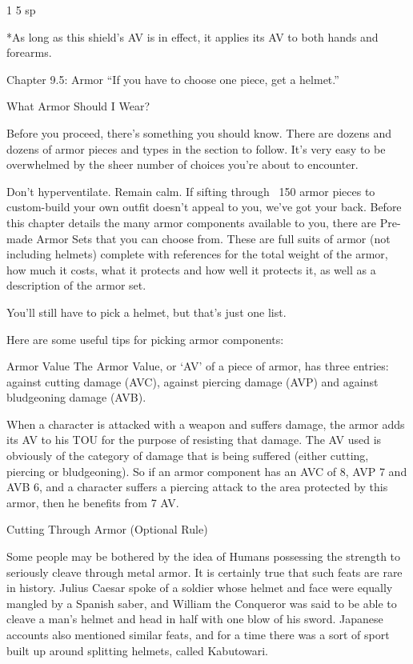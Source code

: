 \documentclass[oneside,11pt,english]{book}
\begin{document}
1 5 sp 

*As long as this shield’s AV is in effect, it applies its AV to both hands and forearms. 

 

Chapter 9.5: Armor 
“If you have to choose one piece, get a helmet.” 

 

What Armor Should I Wear? 

 

Before you proceed, there’s something you should know. There are dozens and dozens of armor pieces 
and types in the section to follow. It’s very easy to be overwhelmed by the sheer number of choices 
you’re about to encounter. 

 

Don’t hyperventilate. Remain calm. If sifting through ~150 armor pieces to custom-build your own outfit 
doesn’t appeal to you, we’ve got your back. Before this chapter details the many armor components 
available to you, there are Pre-made Armor Sets that you can choose from. These are full suits of armor 
(not including helmets) complete with references for the total weight of the armor, how much it costs, 
what it protects and how well it protects it, as well as a description of the armor set. 

 


You’ll still have to pick a helmet, but that’s just one list. 

 

Here are some useful tips for picking armor components: 

 

Armor Value 
The Armor Value, or ‘AV’ of a piece of armor, has three entries: against cutting damage (AVC), against 
piercing damage (AVP) and against bludgeoning damage (AVB). 

 

When a character is attacked with a weapon and suffers damage, the armor adds its AV to his TOU for 
the purpose of resisting that damage. The AV used is obviously of the category of damage that is being 
suffered (either cutting, piercing or bludgeoning). So if an armor component has an AVC of 8, AVP 7 and 
AVB 6, and a character suffers a piercing attack to the area protected by this armor, then he benefits from 
7 AV. 

 

Cutting Through Armor (Optional Rule) 

 

Some people may be bothered by the idea of Humans possessing the strength to seriously cleave through 
metal armor. It is certainly true that such feats are rare in history. Julius Caesar spoke of a soldier whose 
helmet and face were equally mangled by a Spanish saber, and William the Conqueror was said to be able 
to cleave a man’s helmet and head in half with one blow of his sword. Japanese accounts also mentioned 
similar feats, and for a time there was a sort of sport built up around splitting helmets, called Kabutowari. 
\end{document}
